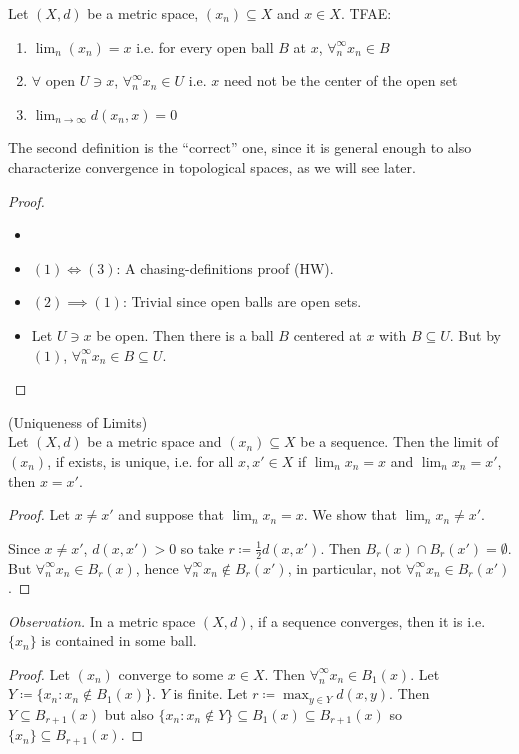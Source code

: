 \documentclass[14pt,oneside]{extarticle}
\begin{document}
\begin{proposition*}
  Let $(X,d)$ be a metric space, $(x_n) \subseteq X$ and $x \in X$. TFAE:
  \begin{enumerate}[nosep]
    \item $\lim_n (x_n) = x$ i.e. for every open ball $B$ at $x$, $\forall^\infty_n x_n \in B$
    \item $\forall$ open $U \ni x$, $\forall^\infty_n x_n \in U$ i.e. $x$ need not be the center of the open set 
    \item $\lim_{n \to \infty} d(x_n, x) = 0$
  \end{enumerate}
\end{proposition*}
The second definition is the ``correct'' one, since it is general enough to also characterize convergence in topological spaces, as we will see later.
\begin{proof}
  \begin{itemize}[label=]
  \item
  \item $(1) \iff (3)$: A chasing-definitions proof (HW).
  \item $(2) \implies (1)$: Trivial since open balls are open sets.
  \item Let $U \ni x$ be open. Then there is a ball $B$ centered at $x$ with $B \subseteq U$. But by $(1)$, $\forall^\infty_n x_n \in B \subseteq U$.
  \end{itemize}
\end{proof}

\begin{proposition*} (Uniqueness of Limits)\\
  Let $(X,d)$ be a metric space and $(x_n) \subseteq X$ be a sequence. Then the limit of $(x_n)$, if exists, is unique, i.e. for all $x, x' \in X$ if $\lim_n x_n = x$ and $\lim_n x_n = x'$, then $x=x'$.
\end{proposition*}
\begin{proof}
  Let $x \neq x'$ and suppose that $\lim_n x_n = x$. We show that $\lim_n x_n \neq x'$.

  \pic   

  Since $x \neq x'$, $d(x,x')>0$ so take $r \coloneqq \frac{1}{2}d(x,x')$. Then $B_r(x) \cap B_r(x') = \emptyset$. But $\forall^\infty_n x_n \in B_r(x)$, hence $\forall^\infty_n x_n \notin B_r(x')$, in particular, not $\forall^\infty_n x_n \in B_r(x')$.
\end{proof}

\textit{Observation.} In a metric space $(X,d)$, if a sequence converges, then it is  i.e. $\{x_n\}$ is contained in some ball.
\begin{proof}
  Let $(x_n)$ converge to some $x \in X$. Then $\forall^\infty_n x_n \in B_1(x)$. Let $Y \coloneqq \{x_n: x_n \notin B_1(x)\}$. $Y$ is finite. Let $r \coloneqq \max_{y \in Y} d(x,y)$. Then $Y \subseteq B_{r+1}(x)$ but also $\{x_n : x_n \notin Y\} \subseteq B_1(x) \subseteq B_{r+1}(x)$ so $\{x_n\} \subseteq B_{r+1}(x)$.
\end{proof}
\end{document}

